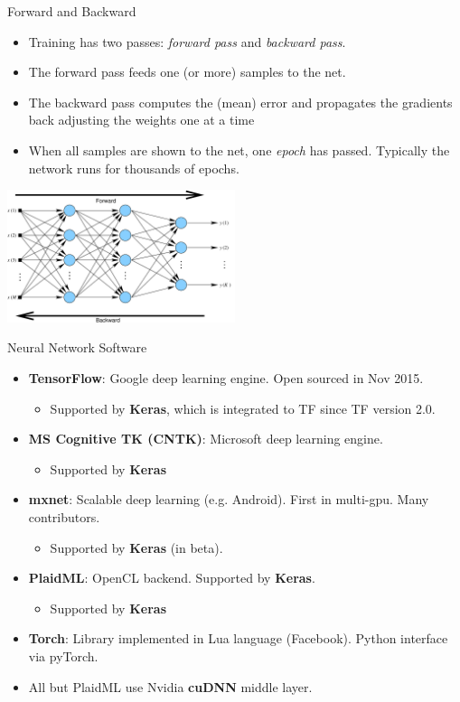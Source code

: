 \documentclass[10pt, aspectratio=169]{beamer} %
\begin{document}
\begin{frame}{Forward and Backward}
	\begin{itemize}
		\item Training has two passes: \emph{forward pass} and \emph{backward pass}.
		\item The forward pass feeds one (or more) samples to the net.
		\item The backward pass computes the (mean) error and propagates the gradients
		back adjusting the weights one at a time
		\item When all samples are shown to the net, one \emph{epoch} has passed. Typically the network
		runs for thousands of epochs.
		\end{itemize}
		
	\centerline{\includegraphics[width=0.5\textwidth]{VanillaNet_FB.pdf}}
	
\end{frame}



\begin{frame}{Neural Network Software}
\begin{itemize}
\item \textbf{TensorFlow}: Google deep learning engine. Open sourced in Nov 2015. 
\begin{itemize}
\item Supported by \textbf{Keras}, which is integrated to TF since TF version 2.0.
\end{itemize}
\item \textbf{MS Cognitive TK (CNTK)}: Microsoft deep learning engine. 
\begin{itemize}
\item Supported by \textbf{Keras}
\end{itemize}
\item \textbf{mxnet}: Scalable deep learning (e.g. Android). First in multi-gpu. Many contributors. 
\begin{itemize}
\item Supported by \textbf{Keras} (in beta).
\end{itemize}
\item \textbf{PlaidML}: OpenCL backend. Supported by \textbf{Keras}.
\begin{itemize}
\item Supported by \textbf{Keras}
\end{itemize}
\item \textbf{Torch}: Library implemented in Lua language (Facebook). Python interface via pyTorch.
\end{itemize}
\begin{itemize}
\item All but PlaidML use Nvidia \textbf{cuDNN} middle layer.
\end{itemize}
\end{frame}
\end{document}
